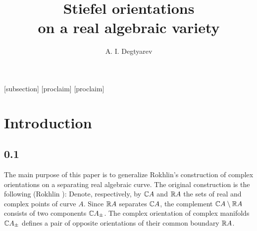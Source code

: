 \documentclass{article}
\begin{document}
\title{
Stiefel orientations\\
on a real algebraic variety}
\author{A. I. Degtyarev}
\maketitle
{}


%
[subsection]{\bf}{\it}
\renewcommand{\theproclaim}{\arabic{section}.\arabic{subsection}.\arabic{proclaim}}
[proclaim]{\bf}{\rm}
[proclaim]{\bf}{\rm}
%
\setcounter{section}{-1}
\section{ Introduction }
\subsection*{ 0.1 }
The main purpose of this paper is to generalize Rokhlin's construction
of complex orientations on a separating real algebraic curve.
The original construction is the following (Rokhlin \cite{6}): 
Denote, respectively, by $\mathbb C A$ and $\mathbb R A$ the sets of real and complex
points of curve $A$. Since $\mathbb R A$ separates $\mathbb C A$, the complement
$\mathbb C A\setminus\mathbb R A$ consists of two components $\mathbb C A_{\pm}$. The complex
orientation of complex manifolds $\mathbb C A_{\pm}$ defines a pair of
opposite orientations of their common boundary $\mathbb R A$.
\end{document}
